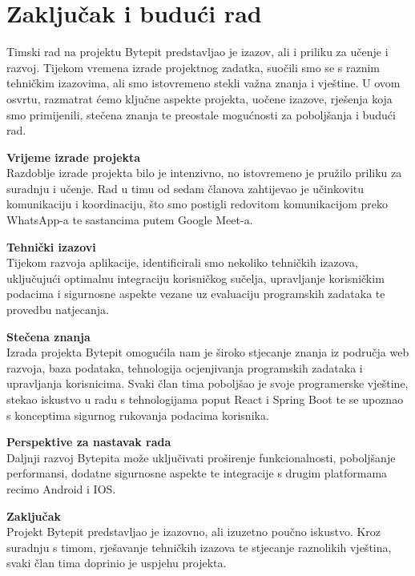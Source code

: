\chapter{Zaključak i budući rad}
		
		
		Timski rad na projektu Bytepit predstavljao je izazov, ali i priliku za učenje i razvoj. Tijekom vremena izrade projektnog zadatka, suočili smo se s raznim tehničkim izazovima, ali smo istovremeno stekli važna znanja i vještine. U ovom osvrtu, razmatrat ćemo ključne aspekte projekta, uočene izazove, rješenja koja smo primijenili, stečena znanja te preostale mogućnosti za poboljšanja i budući rad.
		
		\textbf{Vrijeme izrade projekta}\\
		Razdoblje izrade projekta bilo je intenzivno, no istovremeno je pružilo priliku za suradnju i učenje. Rad u timu od sedam članova zahtijevao je učinkovitu komunikaciju i koordinaciju, što smo postigli redovitom komunikacijom preko WhatsApp-a te sastancima putem Google Meet-a.
		
		\textbf{Tehnički izazovi}\\
		Tijekom razvoja aplikacije, identificirali smo nekoliko tehničkih izazova, uključujući optimalnu integraciju korisničkog sučelja, upravljanje korisničkim podacima i sigurnosne aspekte vezane uz evaluaciju programskih zadataka te provedbu natjecanja.
		
		\textbf{Stečena znanja}\\
		Izrada projekta Bytepit omogućila nam je široko stjecanje znanja iz područja web razvoja, baza podataka, tehnologija ocjenjivanja programskih zadataka i upravljanja korisnicima. Svaki član tima poboljšao je svoje programerske vještine, stekao iskustvo u radu s tehnologijama poput React i Spring Boot te se upoznao s konceptima sigurnog rukovanja podacima korisnika.
		
		\textbf{Perspektive za nastavak rada}\\
		Daljnji razvoj Bytepita može uključivati proširenje funkcionalnosti, poboljšanje performansi, dodatne sigurnosne aspekte te integracije s drugim platformama recimo Android i IOS.
		
		\textbf{Zaključak}\\
		Projekt Bytepit predstavljao je izazovno, ali izuzetno poučno iskustvo. Kroz suradnju s timom, rješavanje tehničkih izazova te stjecanje raznolikih vještina, svaki član tima doprinio je uspjehu projekta. 
	